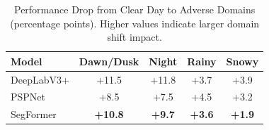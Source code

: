\begin{table}[t]
\centering
\caption{Performance Drop from Clear Day to Adverse Domains (percentage points). Higher values indicate larger domain shift impact.}
\label{tab:domain_shift}
\begin{tabular}{@{}lcccc@{}}
\toprule
\textbf{Model} & \textbf{Dawn/Dusk} & \textbf{Night} & \textbf{Rainy} & \textbf{Snowy} \\
\midrule
DeepLabV3+ & +11.5 & +11.8 & +3.7 & +3.9 \\
PSPNet     & +8.5 & +7.5 & +4.5 & +3.2 \\
SegFormer  & \textbf{+10.8} & \textbf{+9.7} & \textbf{+3.6} & \textbf{+1.9} \\
\bottomrule
\end{tabular}
\end{table}


%
%
%
%
